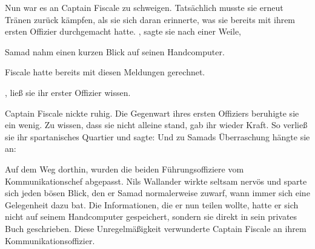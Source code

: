 \par

Nun war es an Captain Fiscale zu schweigen. Tatsächlich musste sie erneut Tränen zurück kämpfen, als sie sich daran erinnerte, was sie bereits mit ihrem ersten Offizier durchgemacht hatte. , sagte sie nach einer Weile, 

\par

Samad nahm einen kurzen Blick auf seinen Handcomputer. 

\par

Fiscale hatte bereits mit diesen Meldungen gerechnet. 

\par

, ließ sie ihr erster Offizier wissen. 

\par

Captain Fiscale nickte ruhig. Die Gegenwart ihres ersten Offiziers beruhigte sie ein wenig. Zu wissen, dass sie nicht alleine stand, gab ihr wieder Kraft. So verließ sie ihr spartanisches Quartier und sagte:  Und zu Samads Überraschung hängte sie an: 

\par

Auf dem Weg dorthin, wurden die beiden Führungsoffiziere vom Kommunikationschef abgepasst. Nils Wallander wirkte seltsam nervös und sparte sich jeden bösen Blick, den er Samad normalerweise zuwarf, wann immer sich eine Gelegenheit dazu bat. Die Informationen, die er nun teilen wollte, hatte er sich nicht auf seinem Handcomputer gespeichert, sondern sie direkt in sein privates Buch geschrieben. Diese Unregelmäßigkeit verwunderte Captain Fiscale an ihrem Kommunikationsoffizier.

\par

